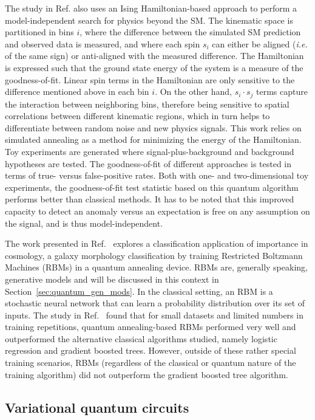 The study in Ref.\cite{matchev2020} also uses an Ising Hamiltonian-based approach to perform a model-independent search for physics beyond the SM.
The kinematic space is partitioned in bins $i$, where the difference between the simulated SM prediction and observed data is measured, and where each spin $s_i$ can either be aligned (\textit{i.e.} of the same sign) or anti-aligned with the measured difference.
The Hamiltonian is expressed such that the ground state energy of the system is a measure of the goodness-of-fit.
Linear spin terms in the Hamiltonian are only sensitive to the difference mentioned above in each bin $i$.
On the other hand, $s_i \cdot s_j$ terms capture the interaction between neighboring bins, therefore being sensitive to spatial correlations between different kinematic regions, which in turn helps to differentiate between random noise and new physics signals.
This work relies on simulated annealing as a method for minimizing the energy of the Hamiltonian.
Toy experiments are generated where signal-plus-background and background hypotheses are tested.
The goodness-of-fit of different approaches is tested in terms of true- versus false-positive rates. Both with one- and two-dimensional toy experiments, the goodness-of-fit test statistic based on this quantum algorithm performs better than classical methods.
It has to be noted that this improved capacity to detect an anomaly versus an expectation is free on any assumption on the signal, and is thus model-independent.

The work presented in Ref.~\cite{caldeira2020restricted} explores a classification application of importance in cosmology, a galaxy morphology classification by training Restricted Boltzmann Machines (RBMs) in a quantum annealing device.
RBMs are, generally speaking, generative models and will be discussed in this context in Section~\ref{sec:quantum_gen_mods}.
In the classical setting, an RBM is a stochastic neural network that can learn a probability distribution over its set of inputs.
The study in Ref.~\cite{caldeira2020restricted} found that for small datasets and limited numbers in training repetitions, quantum annealing-based RBMs performed very well and outperformed the alternative classical algorithms studied, namely logistic regression and gradient boosted trees.
However, outside of these rather special training scenarios, RBMs (regardless of the classical or quantum nature of the training algorithm) did not outperform the gradient boosted tree algorithm.

\subsection{Variational quantum circuits}
\label{sec:vqc}

